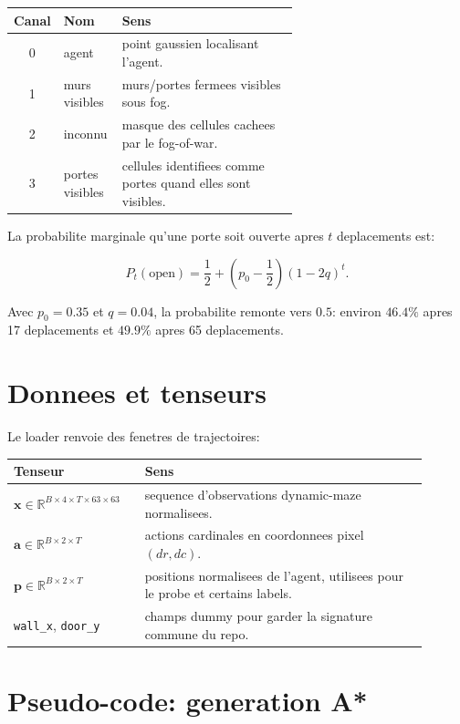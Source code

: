 \documentclass[11pt,a4paper]{article}
\newcommand{\code}[1]{\texttt{#1}}
\begin{document}
\begin{center}
\begin{tabular}{clp{0.62\linewidth}}
\toprule
Canal & Nom & Sens \\
\midrule
0 & agent & point gaussien localisant l'agent. \\
1 & murs visibles & murs/portes fermees visibles sous fog. \\
2 & inconnu & masque des cellules cachees par le fog-of-war. \\
3 & portes visibles & cellules identifiees comme portes quand elles sont visibles. \\
\bottomrule
\end{tabular}
\end{center}

La probabilite marginale qu'une porte soit ouverte apres \(t\) deplacements est:

\[
  P_t(\mathrm{open}) =
  \frac{1}{2} + \left(p_0-\frac{1}{2}\right)(1-2q)^t.
\]

Avec \(p_0=0.35\) et \(q=0.04\), la probabilite remonte vers \(0.5\): environ
\(46.4\%\) apres 17 deplacements et \(49.9\%\) apres 65 deplacements.

\section{Donnees et tenseurs}

Le loader renvoie des fenetres de trajectoires:

\begin{center}
\begin{tabular}{p{0.28\linewidth}p{0.62\linewidth}}
\toprule
Tenseur & Sens \\
\midrule
\(\mathbf{x}\in\mathbb{R}^{B\times 4\times T\times 63\times 63}\)
& sequence d'observations dynamic-maze normalisees. \\
\(\mathbf{a}\in\mathbb{R}^{B\times 2\times T}\)
& actions cardinales en coordonnees pixel \((dr,dc)\). \\
\(\mathbf{p}\in\mathbb{R}^{B\times 2\times T}\)
& positions normalisees de l'agent, utilisees pour le probe et certains labels. \\
\code{wall\_x}, \code{door\_y}
& champs dummy pour garder la signature commune du repo. \\
\bottomrule
\end{tabular}
\end{center}

\section{Pseudo-code: generation A*}
\end{document}
